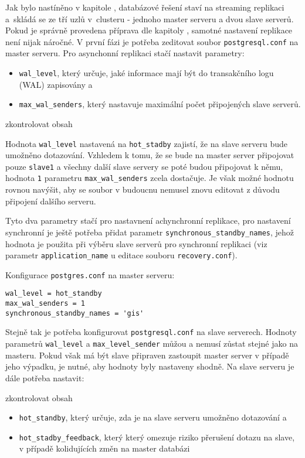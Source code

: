 
Jak bylo nastíněno v kapitole , databázové řešení staví na
streaming replikaci a~skládá se ze tří uzlů v~clusteru - jednoho master serveru a
dvou slave serverů. Pokud je správně provedena příprava dle kapitoly
, samotné nastavení replikace není nijak náročné. V
první fázi je potřeba zeditovat soubor \texttt{postgresql.conf} na master
serveru. Pro asynchonní replikaci stačí nastavit parametry:
\begin{itemize}
\item \texttt{wal\_level}, který určuje, jaké informace mají být do transakčního
  logu (WAL) zapisovány a
\item \texttt{max\_wal\_senders}, který nastavuje maximální počet připojených slave serverů.
\end{itemize}

\begin{framed}
  zkontrolovat obsah
\end{framed}

Hodnota \texttt{wal\_level} nastavená na \texttt{hot\_stadby} zajistí, že na
slave serveru bude umožněno dotazování. Vzhledem k tomu, že se bude na master
server připojovat pouze \texttt{slave1} a všechny další slave servery se poté
budou připojovat k němu, hodnota \texttt{1} parametru \texttt{max\_wal\_senders}
zcela dostačuje. Je však možné hodnotu rovnou navýšit, aby se soubor v budoucnu
nemusel znovu editovat z důvodu připojení dalšího serveru.

Tyto dva parametry stačí pro nastavnení achynchronní replikace, pro nastavení
synchronní je ještě potřeba přidat parametr
\texttt{synchronous\_standby\_names}, jehož hodnota je použita při výběru slave
serverů pro synchronní replikaci (viz parametr \texttt{application\_name} u
editace souboru \texttt{recovery.conf}).

Konfigurace \texttt{postgres.conf} na master serveru:
\begin{lstlisting}
wal_level = hot_standby
max_wal_senders = 1
synchronous_standby_names = 'gis'
\end{lstlisting}

Stejně tak je potřeba konfigurovat \texttt{postgresql.conf} na slave serverech.
Hodnoty parametrů \texttt{wal\_level} a \texttt{max\_level\_sender} můžou a
nemusí zůstat stejné jako na masteru. Pokud však má být slave připraven
zastoupit master server v případě jeho výpadku, je nutné, aby hodnoty byly
nastaveny shodně.  Na slave serveru je dále potřeba nastavit:
\begin{framed}
  zkontrolovat obsah
\end{framed}
\begin{itemize}
  \item\texttt{hot\_standby}, který určuje, zda je na slave serveru umožněno
    dotazování a
  \item\texttt{hot\_stadby\_feedback}, který který omezuje riziko přerušení
    dotazu na slave, v případě kolidujících změn na master databázi
\end{itemize}

